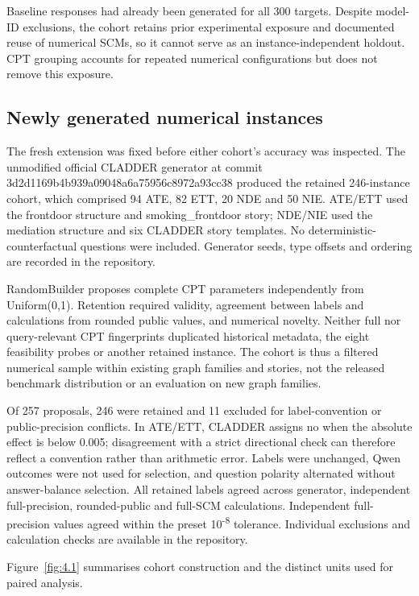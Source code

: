 Baseline responses had already been generated for all 300 targets. Despite model-ID exclusions, the cohort retains prior experimental exposure and documented reuse of numerical SCMs, so it cannot serve as an instance-independent holdout. CPT grouping accounts for repeated numerical configurations but does not remove this exposure.

\subsection{Newly generated numerical instances}\label{sec:4.1.1}

The fresh extension was fixed before either cohort's accuracy was inspected. The unmodified official CLADDER generator at commit 3d2d1169b4b939a09048a6a75956c8972a93cc38 produced the retained 246-instance cohort, which comprised 94 ATE, 82 ETT, 20 NDE and 50 NIE. ATE/ETT used the frontdoor structure and smoking\_frontdoor story; NDE/NIE used the mediation structure and six CLADDER story templates. No deterministic-counterfactual questions were included. Generator seeds, type offsets and ordering are recorded in the repository.

RandomBuilder proposes complete CPT parameters independently from Uniform(0,1). Retention required validity, agreement between labels and calculations from rounded public values, and numerical novelty. Neither full nor query-relevant CPT fingerprints duplicated historical metadata, the eight feasibility probes or another retained instance. The cohort is thus a filtered numerical sample within existing graph families and stories, not the released benchmark distribution or an evaluation on new graph families.

Of 257 proposals, 246 were retained and 11 excluded for label-convention or public-precision conflicts. In ATE/ETT, CLADDER assigns no when the absolute effect is below 0.005; disagreement with a strict directional check can therefore reflect a convention rather than arithmetic error. Labels were unchanged, Qwen outcomes were not used for selection, and question polarity alternated without answer-balance selection. All retained labels agreed across generator, independent full-precision, rounded-public and full-SCM calculations. Independent full-precision values agreed within the preset 10\textsuperscript{-}\textsuperscript{8} tolerance. Individual exclusions and calculation checks are available in the repository.

Figure~\ref{fig:4.1} summarises cohort construction and the distinct units used for paired analysis.

